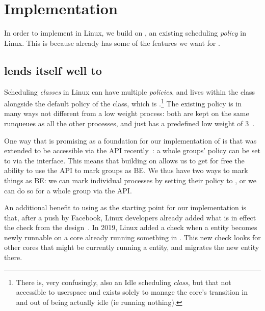 \section{Implementation}\label{s:implementation}


In order to implement \beclass{} in Linux, we build on \schedidle{}, an existing
scheduling \textit{policy} in Linux. This is because \schedidle{} already has
some of the features we want for \beclass{}.

\subsection{\schedidle{} lends itself well to \beclass{}}

Scheduling \textit{classes} in Linux can have multiple \textit{policies}, and
\schedidle{} lives within the \normalclass{} class alongside the default policy
of the \normalclass{} class, which is \schednormal{}.\footnote{There is, very
confusingly, also an Idle scheduling \textit{class}, but that not accessible to
userspace and exists solely to manage the core's transition in and out of being
actually idle (ie running nothing).} The existing \schedidle{} policy is in many
ways not different from a low weight \schednormal{} process: both are kept on
the same runqueues as all the other \schednormal{} processes, and \schedidle{}
just has a predefined low weight of 3~\cite{weight-idleprio}.

One way that \schedidle{} is promising as a foundation for our implementation of
\beclass{} is that \schedidle{} was extended to be accessible via the \cgroups{}
API recently~\cite{lkml-idle-cgroup}: a whole groups' policy can be set to
\schedidle{} via the \cgroups{} interface. This means that building on
\schedidle{} allows us to get for free the ability to use the \cgroups{} API to
mark groups as BE. We thus have two ways to mark things as BE: we can mark
individual processes by setting their policy to \schedidle{}, or we can do so
for a whole group via the \cgroups{} API.

An additional benefit to using \schedidle{} as the starting point for our
implementation is that, after a push by Facebook, Linux developers already added
what is in effect the \entry{} check from the \beclass{}
design~\cite{fixing-idle-article}. In 2019, Linux added a check when a
\schednormal{} entity becomes newly runnable on a core already running something
in \schednormal{}. This new check looks for other cores that might be currently
running a \schedidle{} entity, and migrates the new entity there.

